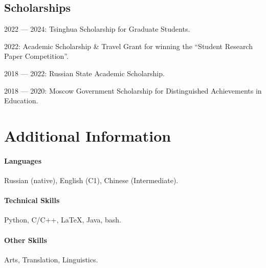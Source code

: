 \begin{resume}
  \subsection*{Scholarships}

  \begin{achievements}
    \item 2022 --- 2024: Tsinghua Scholarship for Graduate Students.
    \item 2022: Academic Scholarship \& Travel Grant for winning the ``Student Research Paper Competition''.
    \item 2018 --- 2022: Russian State Academic Scholarship.
    \item 2018 --- 2020: Moscow Government Scholarship for Distinguished Achievements in Education.
  \end{achievements}

  \section*{Additional Information}

  \paragraph{Languages} Russian (native), English (C1), Chinese (Intermediate).

  \paragraph{Technical Skills} Python, C/C++, \LaTeX, Java, bash.

  \paragraph{Other Skills} Arts, Translation, Linguistics.

\end{resume}
